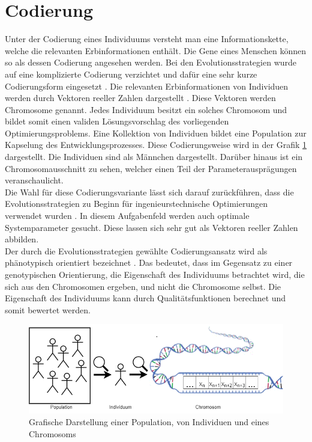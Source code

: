 \section{Codierung}
Unter der Codierung eines Individuums versteht man eine Informationskette, welche die relevanten Erbinformationen enthält.
Die Gene eines Menschen können so als dessen Codierung angesehen werden.
Bei den Evolutionsstrategien wurde auf eine komplizierte Codierung verzichtet und dafür eine sehr kurze Codierungsform eingesetzt \cite[S.~147]{schoeneburg}. Die relevanten Erbinformationen von Individuen werden durch Vektoren reeller Zahlen dargestellt \cite[S.~147]{schoeneburg}. Diese Vektoren werden Chromosome genannt. Jedes Individuum besitzt ein solches Chromosom und bildet somit einen validen Lösungsvorschlag des vorliegenden Optimierungsproblems.
Eine Kollektion von Individuen bildet eine Population zur Kapselung des Entwicklungsprozesses. Diese Codierungsweise wird in der Grafik \ref{fig:codierung} dargestellt. Die Individuen sind als Männchen dargestellt. Darüber hinaus ist ein Chromosomausschnitt zu sehen, welcher einen Teil der Parameterausprägungen veranschaulicht.\\
Die Wahl für diese Codierungsvariante lässt sich darauf zurückführen, dass die Evolutionsstrategien zu Beginn für ingenieurstechnische Optimierungen verwendet wurden \cite[S.~147]{schoeneburg}.
In diesem Aufgabenfeld werden auch optimale Systemparameter gesucht. Diese lassen sich sehr gut als Vektoren reeller Zahlen abbilden.\\
Der durch die Evolutionsstrategien gewählte Codierungsansatz wird als phänotypisch orientiert bezeichnet \cite[S.~148]{schoeneburg}. Das bedeutet, dass im Gegensatz zu einer genotypischen Orientierung, die Eigenschaft des Individuums betrachtet wird, die sich aus den Chromosomen ergeben, und nicht die Chromosome selbst.
Die Eigenschaft des Individuums kann durch Qualitätsfunktionen berechnet und somit bewertet werden.

\begin{figure}[!htb]
	\centering
	\includegraphics[width=1.\textwidth]{img/codierung/codierung.png}
	\caption{Grafische Darstellung einer Population, von Individuen und eines Chromosoms}
\label{fig:codierung}
\end{figure}
